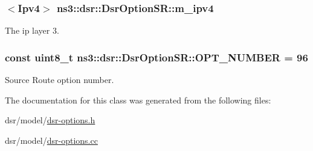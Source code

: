 \subsubsection[{\texorpdfstring{m\+\_\+ipv4}{m_ipv4}}]{$<${\bf Ipv4}$>$ ns3\+::dsr\+::\+Dsr\+Option\+S\+R\+::m\+\_\+ipv4\hspace{0.3cm}{\ttfamily [private]}}\hypertarget{classns3_1_1dsr_1_1DsrOptionSR_a6f9e883b6d334eec90f76d3206ff3e16}{}\label{classns3_1_1dsr_1_1DsrOptionSR_a6f9e883b6d334eec90f76d3206ff3e16}


The ip layer 3. 

\subsubsection[{\texorpdfstring{O\+P\+T\+\_\+\+N\+U\+M\+B\+ER}{OPT_NUMBER}}]{\setlength{\rightskip}{0pt plus 5cm}const uint8\+\_\+t ns3\+::dsr\+::\+Dsr\+Option\+S\+R\+::\+O\+P\+T\+\_\+\+N\+U\+M\+B\+ER = 96\hspace{0.3cm}{\ttfamily [static]}}\hypertarget{classns3_1_1dsr_1_1DsrOptionSR_a6da9ac0656903ab8ecd89c7e147479b2}{}\label{classns3_1_1dsr_1_1DsrOptionSR_a6da9ac0656903ab8ecd89c7e147479b2}


Source Route option number. 



The documentation for this class was generated from the following files\+:\begin{DoxyCompactItemize}
\item 
dsr/model/\hyperlink{dsr-options_8h}{dsr-\/options.\+h}\item 
dsr/model/\hyperlink{dsr-options_8cc}{dsr-\/options.\+cc}\end{DoxyCompactItemize}
